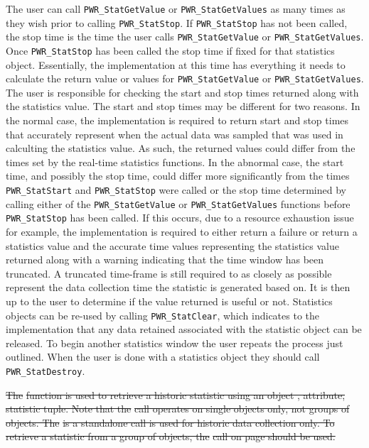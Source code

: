\documentclass[12pt]{report} %
\providecommand{\DIFdeltex}[1]{{\protect\color{red}\sout{#1}}}                      %
\providecommand{\DIFdelbegin}{} %
\providecommand{\DIFdel}[1]{\texorpdfstring{\DIFdeltex{#1}}{}} %
\newcommand{\DIFscaledelfig}{0.5}
\newlength{\DIFdelgraphicswidth} %
\newlength{\DIFdelgraphicsheight} %
\newcommand{\DIFdelincludegraphics}[2][]{%
\sbox{\DIFdelgraphicsbox}{\DIFOincludegraphics[#1]{#2}}%
\settoboxwidth{\DIFdelgraphicswidth}{\DIFdelgraphicsbox} %
\settoboxtotalheight{\DIFdelgraphicsheight}{\DIFdelgraphicsbox} %
\scalebox{\DIFscaledelfig}{%
\parbox[b]{\DIFdelgraphicswidth}{\usebox{\DIFdelgraphicsbox}\\[-\baselineskip] \rule{\DIFdelgraphicswidth}{0em}}\llap{\resizebox{\DIFdelgraphicswidth}{\DIFdelgraphicsheight}{%
\setlength{\unitlength}{\DIFdelgraphicswidth}%
\begin{picture}(1,1)%
\thicklines\linethickness{2pt} %
{\color[rgb]{1,0,0}\put(0,0){\framebox(1,1){}}}%
{\color[rgb]{1,0,0}\put(0,0){\line( 1,1){1}}}%
{\color[rgb]{1,0,0}\put(0,1){\line(1,-1){1}}}%
\end{picture}%
}\hspace*{3pt}}} %
} %
\DeclareRobustCommand{\DIFdelbegin}{\DIFOdelbegin \let\includegraphics\DIFdelincludegraphics} %
\begin{document}
The user can call \texttt{PWR_StatGetValue} or \texttt{PWR_StatGetValues} as many times as they wish prior to calling \texttt{PWR_StatStop}.
If \texttt{PWR_StatStop} has not been called, the stop time is the time the user calls \texttt{PWR_StatGetValue} or \texttt{PWR_StatGetValues}.
Once \texttt{PWR_StatStop} has been called the stop time if fixed for that statistics object. 
Essentially, the implementation at this time has everything it needs to calculate the return value or values for \texttt{PWR_StatGetValue} or \texttt{PWR_StatGetValues}.
The user is responsible for checking the start and stop times returned along with the statistics value. 
The start and stop times may be different for two reasons.
In the normal case, the implementation is required to return start and stop times that accurately represent when the actual data was sampled that was used in calculting the statistics value.
As such, the returned values could differ from the times set by the real-time statistics functions.
In the abnormal case, the start time, and possibly the stop time, could differ more significantly from the times \texttt{PWR_StatStart} and \texttt{PWR_StatStop} were called or the stop time determined by calling either of the \texttt{PWR_StatGetValue} or \texttt{PWR_StatGetValues} functions before \texttt{PWR_StatStop} has been called. 
If this occurs, due to a resource exhaustion issue for example, the implementation is required to either return a failure or return a statistics value and the accurate time values representing the statistics value returned along with a warning indicating that the time window has been truncated. 
A truncated time-frame is still required to as closely as possible represent the data collection time the statistic is generated based on.
It is then up to the user to determine if the value returned is useful or not.
Statistics objects can be re-used by calling \texttt{PWR_StatClear}, which indicates to the implementation that any data retained associated with the statistic object can be released. 
To begin another statistics window the user repeats the process just outlined.
When the user is done with a statistics object they should call \texttt{PWR_StatDestroy}.

\DIFdelbegin %

\DIFdel{The }%
\DIFdel{function is used to retrieve a historic statistic using an object , attribute, statistic tuple.
Note that the }%
\DIFdel{call operates on single objects only, not groups of objects.
The }%
\DIFdel{is a standalone call is used for historic data collection only.
To retrieve a statistic from a group of objects, the }%
\DIFdel{call on page \pageref{func:GrpGetStats} should be used.
}%
\end{document}
